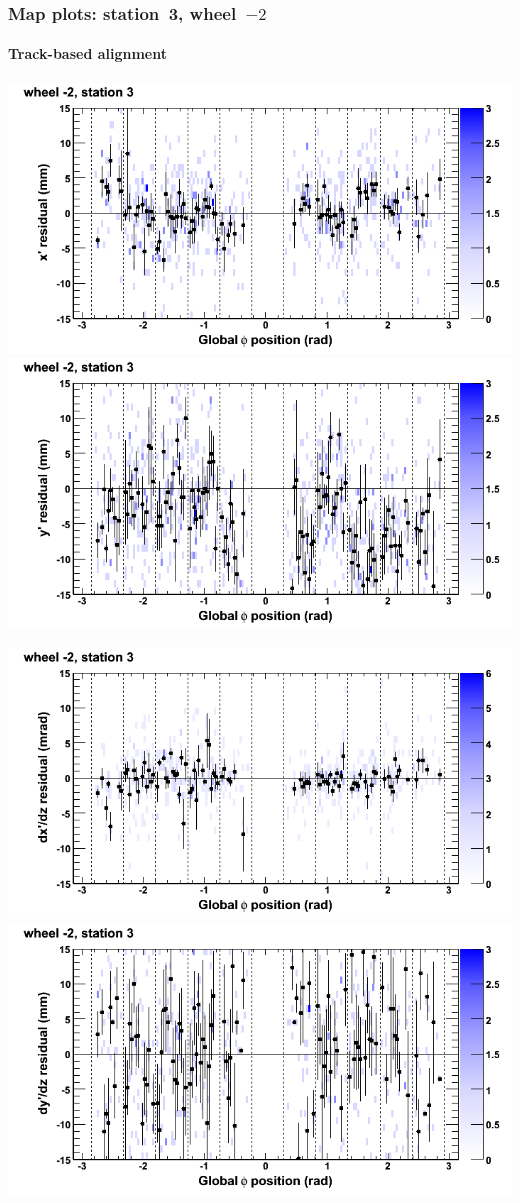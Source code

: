 \documentclass[compress]{beamer}
\begin{document}
\begin{frame}
\frametitle{Map plots: station~3, wheel~$-2$}
\framesubtitle{Track-based alignment}
\includegraphics[width=0.5\linewidth]{mapplots_re05/DTvsphi_st3whA_x.png}
\includegraphics[width=0.5\linewidth]{mapplots_re05/DTvsphi_st3whA_y.png}

\includegraphics[width=0.5\linewidth]{mapplots_re05/DTvsphi_st3whA_dxdz.png}
\includegraphics[width=0.5\linewidth]{mapplots_re05/DTvsphi_st3whA_dydz.png}
\end{frame}
\end{document}
